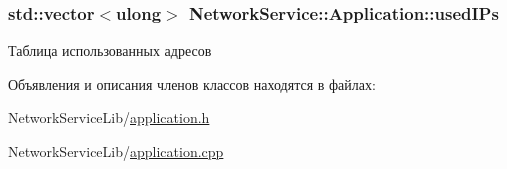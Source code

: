 \subsubsection[{used\+I\+Ps}]{\setlength{\rightskip}{0pt plus 5cm}std\+::vector$<$ulong$>$ Network\+Service\+::\+Application\+::used\+I\+Ps\hspace{0.3cm}{\ttfamily [private]}}\label{class_network_service_1_1_application_a9709635bcf03ef131a655ca1c58efa6b}


Таблица использованных адресов 



Объявления и описания членов классов находятся в файлах\+:\begin{DoxyCompactItemize}
\item 
Network\+Service\+Lib/\hyperlink{application_8h}{application.\+h}\item 
Network\+Service\+Lib/\hyperlink{application_8cpp}{application.\+cpp}\end{DoxyCompactItemize}
